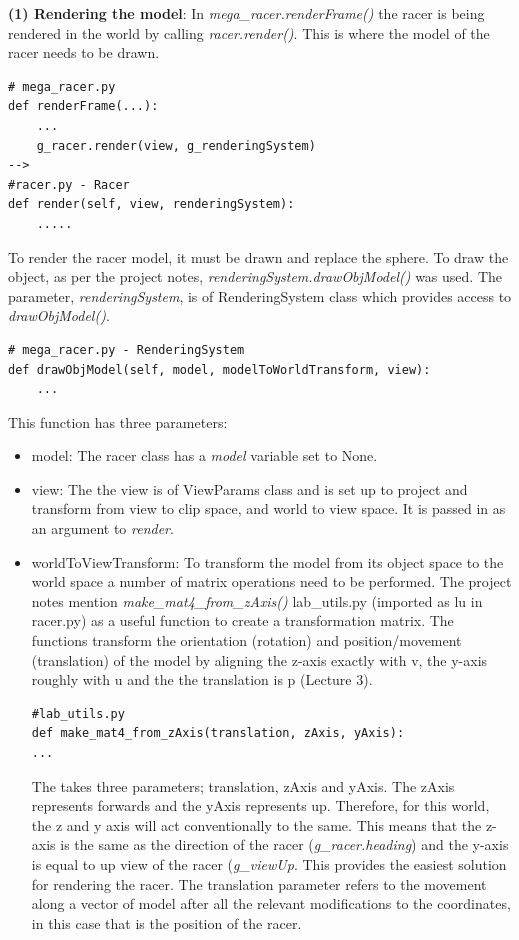 \documentclass[a4 paper, 12pt]{article}
\begin{document}
\textbf{(1) Rendering the model}: In \textit{mega\_racer.renderFrame()} the racer is being rendered in the world by calling \textit{racer.render()}. This is where the model of the racer needs to be drawn. 
    \begin{lstlisting}    
# mega_racer.py
def renderFrame(...):
    ...
    g_racer.render(view, g_renderingSystem)  
-->
#racer.py - Racer
def render(self, view, renderingSystem):
    .....
    \end{lstlisting}  

To render the racer model, it must be drawn and replace the sphere. To draw the object, as per the project notes, \textit{renderingSystem.drawObjModel()} was used. The parameter, \textit{renderingSystem}, is of RenderingSystem class which provides access to \textit{drawObjModel()}. 
    \begin{lstlisting}
# mega_racer.py - RenderingSystem
def drawObjModel(self, model, modelToWorldTransform, view):
    ...
    \end{lstlisting} 

This function has three parameters:
\begin{itemize}
    \item model: The racer class has a \textit{model} variable set to None.
    \item view: The the view is of ViewParams class and is set up to project and transform from view to clip space, and world to view space. It is passed in as an argument to \textit{render}.
    \item worldToViewTransform: To transform the model from its object space to the world space a number of matrix operations need to be performed. The project notes mention \textit{make\_mat4\_from\_zAxis()} lab\_utils.py (imported as lu in racer.py) as a useful function to create a transformation matrix. The functions transform the orientation (rotation) and position/movement (translation) of the model by aligning the z-axis exactly with v, the y-axis roughly with u and the the translation is p (Lecture 3).   
    \begin{lstlisting} 
#lab_utils.py    
def make_mat4_from_zAxis(translation, zAxis, yAxis):
...    
    \end{lstlisting}    
    The takes three parameters; translation, zAxis and yAxis. The zAxis represents forwards and the yAxis represents up. Therefore, for this world, the z and y axis will act conventionally to the same. This means that the z-axis is the same as the direction of the racer (\textit{g\_racer.heading}) and the y-axis is equal to up view of the racer (\textit{g\_viewUp}. This provides the easiest solution for rendering the racer. The translation parameter refers to the movement along a vector of model after all the relevant modifications to the coordinates, in this case that is the position of the racer.    
\end{itemize}
\end{document}
